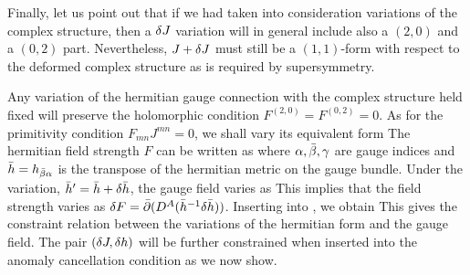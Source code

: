 Finally, let us point out that if we had taken into consideration
variations of the complex structure, then a $\delta J$ variation will
in general include also a $(2,0)$ and a $(0,2)$ part.
Nevertheless, $J+ \delta J$ must still be a $(1,1)$-form with respect
to the deformed complex structure as is required by supersymmetry.



Any variation of the hermitian gauge connection with the complex
structure held fixed will preserve the holomorphic condition
$F^{(2,0)}=F^{(0,2)}=0$. As for the primitivity condition
$F_{mn}J^{mn}=0$, we shall vary its equivalent form \eqn{} The hermitian
field strength $F$ can be written as \eqn{}
where $\alpha, {\bar \beta}, \gamma$ are gauge indices and ${\bar h}=h_{{\bar \beta} \alpha}$ is the
transpose of the hermitian metric on the gauge bundle. Under the
variation, ${\bar h}'={\bar h}+\delta {\bar h}$, the gauge field varies as
\eqn{}
This implies that the field strength varies as $\delta F =  {\bar \partial}
(D^A({\bar h}^{-1}\delta{\bar h}))$. Inserting into \FJsvar, we obtain
\eqn{} This gives the constraint relation between the variations of
the hermitian form and the gauge field. The pair $(\delta J, \delta h)$
will be further constrained when inserted into the anomaly
cancellation condition as we now show.


